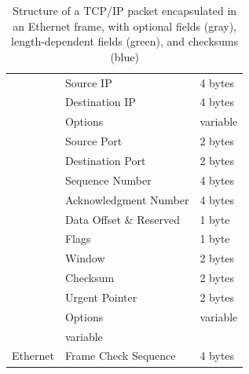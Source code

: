 \documentclass[twocolumn]{article}
\begin{document}
\begin{table}
\begin{center}
\begin{tabular}{|l|l|l|}
                                    & Source IP                                  & 4 bytes                     \\\hhline{|~|-|-|}
                                    & Destination IP                             & 4 bytes                     \\\hhline{|~|-|-|}
                                    & \cellcolor{gray!20}Options                 & \cellcolor{gray!20}variable \\\hhline{|-|-|-|}
      \multirow{9}{4em}{TCP}        & Source Port                                & 2 bytes                     \\\hhline{|~|-|-|}
                                    & Destination Port                           & 2 bytes                     \\\hhline{|~|-|-|}
                                    & \cellcolor{green!10}Sequence Number        & \cellcolor{green!10}4 bytes \\\hhline{|~|-|-|}
                                    & \cellcolor{green!10}Acknowledgment Number  & \cellcolor{green!10}4 bytes \\\hhline{|~|-|-|}
                                    & Data Offset \& Reserved                    & 1 byte                      \\\hhline{|~|-|-|}
                                    & Flags                                      & 1 byte                      \\\hhline{|~|-|-|}
                                    & Window                                     & 2 bytes                     \\\hhline{|~|-|-|}
                                    & \cellcolor{blue!10}Checksum                & \cellcolor{blue!10}2 bytes  \\\hhline{|~|-|-|}
                                    & Urgent Pointer                             & 2 bytes                     \\\hhline{|~|-|-|}
                                    & \cellcolor{gray!20}Options                 & \cellcolor{gray!20}variable \\\hhline{|-|-|-|}
      \multicolumn{2}{|l|}{Payload} & variable                                                                 \\\hhline{|-|-|-|}
      Ethernet                      & \cellcolor{blue!10}Frame Check Sequence    & \cellcolor{blue!10}4 bytes  \\\hline
    \end{tabular}
    \caption{Structure of a TCP/IP packet encapsulated in an Ethernet frame, with optional fields (gray), length-dependent fields (green), and checksums (blue)}
    \label{tab:NetworkPacket}
  \end{center}
\end{table}
\end{document}
